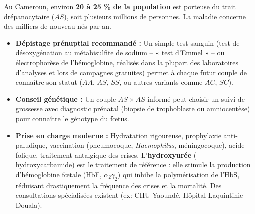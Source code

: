 \documentclass[11pt]{article}
\begin{document}
\begin{savaistu}
Au Cameroun, environ \textbf{20 à 25 \% de la population} est porteuse du trait drépanocytaire ($AS$), soit plusieurs millions de personnes. La maladie concerne des milliers de nouveau-nés par an.
\begin{itemize}
\item \textbf{Dépistage prénuptial recommandé :} Un simple test sanguin (test de désoxygénation au métabisulfite de sodium -- « test d'Emmel » -- ou électrophorèse de l'hémoglobine, réalisés dans la plupart des laboratoires d'analyses et lors de campagnes gratuites) permet à chaque futur couple de connaître son statut ($AA$, $AS$, $SS$, ou autres variants comme $AC$, $SC$).
\item \textbf{Conseil génétique :} Un couple $AS \times AS$ informé peut choisir un suivi de grossesse avec diagnostic prénatal (biopsie de trophoblaste ou amniocentèse) pour connaître le génotype du fœtus.
\item \textbf{Prise en charge moderne :} Hydratation rigoureuse, prophylaxie anti-paludique, vaccination (pneumocoque, \emph{Haemophilus}, méningocoque), acide folique, traitement antalgique des crises. L'\textbf{hydroxyurée} ( hydroxycarbamide) est le traitement de référence : elle stimule la production d'hémoglobine fœtale (HbF, $\alpha_2\gamma_2$) qui inhibe la polymérisation de l'HbS, réduisant drastiquement la fréquence des crises et la mortalité. Des consultations spécialisées existent (ex: CHU Yaoundé, Hôpital Laquintinie Douala).
\end{itemize}
\end{savaistu}
\end{document}
